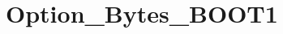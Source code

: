 \hypertarget{group___option___bytes___b_o_o_t1}{\section{Option\-\_\-\-Bytes\-\_\-\-B\-O\-O\-T1}
\label{group___option___bytes___b_o_o_t1}
}
